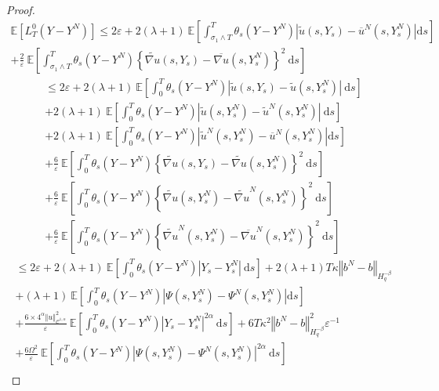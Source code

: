 \documentclass[11pt]{enstaPRE}
\newcommand{\norme}[1]{\left\Vert #1\right\Vert}
\newcommand{\E}{\mathbb{E}}
\newcommand{\di}{\mathrm{d}}
\begin{document}
\begin{proof}
    \begin{multline*}
    \E\left[L^0_T(Y-Y^N)\right] \leq 2\varepsilon + 2(\lambda + 1)\ \E\left[\int_{\sigma_1\wedge T}^T\theta_s\left(Y-Y^N\right)\left|\widetilde{u}\left(s,Y_s\right)-\overline{u}^N\left(s,Y_s^N\right)\right| \di s \right]\\
    +\frac{2}{\varepsilon}\ \E\left[\int_{\sigma_1\wedge T}^T \theta_s\left(Y-Y^N\right)\left\{\widetilde{\nabla u}\left(s,Y_s\right)-{\overline{\nabla u}}\left(s,Y_s^N\right)\right\}^2\ \di s\right]
    \end{multline*}
    \begin{multline*}
    \leq 2\varepsilon + 2(\lambda + 1)\ \E\left[\int_0^T\theta_s\left(Y-Y^N\right)\left|\widetilde{u}\left(s,Y_s\right)-\widetilde{u}\left(s,Y_s^N\right)\right|\ \di s \right]\\+2(\lambda + 1)\ \E\left[\int_0^T\theta_s\left(Y-Y^N\right)\left|\widetilde{u}\left(s,Y_s^N\right)-\widetilde{u}^N\left(s,Y_s^N\right)\right|\ \di s \right]\\+ 2(\lambda + 1)\ \E\left[\int_{0}^T\theta_s\left(Y-Y^N\right)\left|\widetilde{u}^N\left(s,Y_s^N\right)-\overline{u}^N\left(s,Y_s^N\right)\right| \di s \right]\\
    +\frac{6}{\varepsilon}\ \E\left[\int_0^T \theta_s\left(Y-Y^N\right)\left\{\widetilde{\nabla u}\left(s,Y_s\right)-\widetilde{\nabla u}\left(s,Y_s^N\right)\right\}^2\ \di s\right]\\
    +\frac{6}{\varepsilon}\ \E\left[\int_0^T \theta_s\left(Y-Y^N\right)\left\{\widetilde{\nabla u}\left(s,Y_s^N\right)-\widetilde{\nabla u}^N\left(s,Y_s^N\right)\right\}^2\ \di s\right]\\
    +\frac{6}{\varepsilon}\ \E\left[\int_{0}^T \theta_s\left(Y-Y^N\right)\left\{\widetilde{\nabla u}^N\left(s,Y_s^N\right)-{\overline{\nabla u}^N}\left(s,Y_s^N\right)\right\}^2\ \di s\right]
    \end{multline*}
    \begin{multline*}
    \leq 2\varepsilon + 2(\lambda + 1)\ \E\left[\int_0^T\theta_s\left(Y-Y^N\right)\left|Y_s - Y^N_s\right|\ \di s \right] + 2(\lambda + 1)T\kappa\norme{b^N-b}_{H^{-\beta}_{q}} \\
    + (\lambda + 1)\ \E\left[\int_{0}^T\theta_s\left(Y-Y^N\right)\left|\Psi\left(s,Y_s^N\right)-\Psi^N\left(s,Y_s^N\right)\right| \di s \right]\\  
    +\frac{6\times4^{\alpha}\norme{u}_{\mathcal{C}^{1,\alpha}}^2}{\varepsilon}\ \E\left[\int_0^T \theta_s\left(Y-Y^N\right)\left|Y_s - Y^N_s\right|^{2\alpha}\ \di s\right]  + 6T\kappa^2\norme{b^N-b}_{H^{-\beta}_{q}}^2\varepsilon^{-1} \\+\frac{6\Omega^2}{\varepsilon}\ \E\left[\int_{0}^T \theta_s\left(Y-Y^N\right)\left|\Psi\left(s,Y_s^N\right)-{\Psi^N}\left(s,Y_s^N\right)\right|^{2\alpha}\ \di s\right]\\

\end{multline*}
\end{proof}
\end{document}

